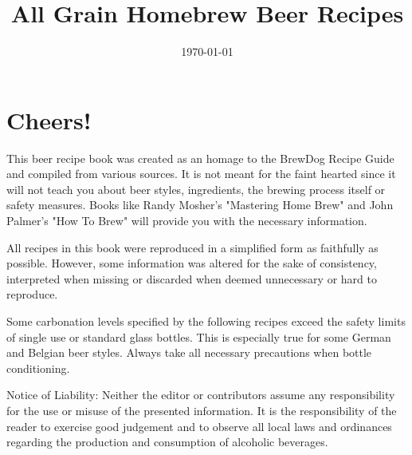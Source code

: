 \documentclass[parskip=half,fontsize=9pt,oneside,toc=chapterentrydotfill]{scrbook}
\begin{document}
\title{All Grain Homebrew Beer Recipes}
\date{\today}
\publishers{Editor: Thomas Ascher}
\dedication{Dedicated to BrauCampus Graz Hobbybrauer Stammtisch}
\maketitle

\frontmatter

\chapter*{Cheers!}

This beer recipe book was created as an homage to the BrewDog Recipe
Guide and compiled from various sources. It is not meant for the faint hearted
since it will not teach you about beer styles, ingredients, the brewing
process itself or safety measures. Books like Randy Mosher's "Mastering Home Brew"
and John Palmer's "How To Brew" will provide you with the necessary information.

All recipes in this book were reproduced in a simplified form as faithfully
as possible. However, some information was altered for the sake of consistency,
interpreted when missing or discarded when deemed unnecessary or hard to reproduce.

Some carbonation levels specified by the following recipes exceed the safety
limits of single use or standard glass bottles. This is especially true for some
German and Belgian beer styles. Always take all necessary precautions when
bottle conditioning.

Notice of Liability: Neither the editor or contributors assume any responsibility
for the use or misuse of the presented information. It is the responsibility of
the reader to exercise good judgement and to observe all local laws and ordinances
regarding the production and consumption of alcoholic beverages.

\tableofcontents

\mainmatter









\end{document}
